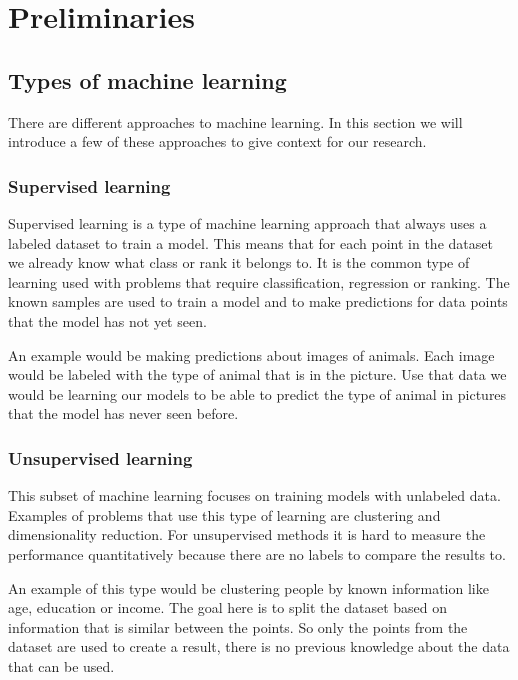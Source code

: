 \chapter{Preliminaries}\label{ch:preliminaries}

\section{Types of machine learning}
\label{sec:prelim:types-of-machine-learning}

There are different approaches to machine learning. In this section we will introduce a few of these approaches to give context for our research.


\subsection{Supervised learning}

Supervised learning \cite{mohri_foundations_2012} is a type of machine learning approach that always uses a labeled dataset to train a model. This means that for each point in the dataset we already know what class or rank it belongs to. It is the common type of learning used with problems that require classification, regression or ranking. The known samples are used to train a model and to make predictions for data points that the model has not yet seen.

An example would be making predictions about images of animals. Each image would be labeled with the type of animal that is in the picture. Use that data we would be learning our models to be able to predict the type of animal in pictures that the model has never seen before.

\subsection{Unsupervised learning}

This subset of machine learning focuses on training models with unlabeled data. Examples of problems that use this type of learning are clustering and dimensionality reduction. For unsupervised methods it is hard to measure the performance quantitatively because there are no labels to compare the results to.

An example of this type would be clustering people by known information like age, education or income. The goal here is to split the dataset based on information that is similar between the points. So only the points from the dataset are used to create a result, there is no previous knowledge about the data that can be used.

